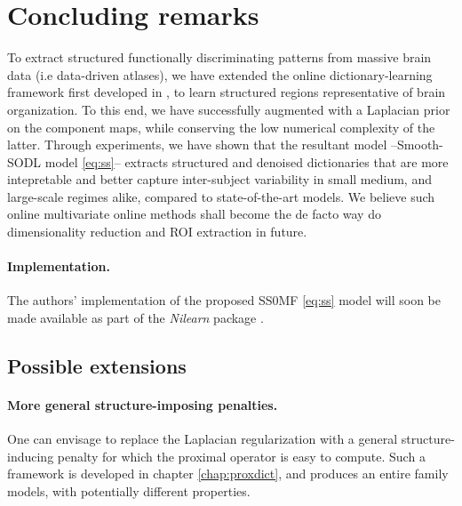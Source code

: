 \section{Concluding remarks}
To extract structured functionally discriminating patterns
from massive brain data (i.e data-driven atlases), we have extended
the online dictionary-learning framework first developed in
  \citep{mairal2010}, to learn structured regions
representative of brain organization. To this end, we have successfully augmented   \citep{mairal2010} with a Laplacian prior on the component maps,
while conserving the low numerical complexity of the latter.
Through experiments, we have shown that the resultant model --Smooth-SODL model \eqref{eq:ss}-- extracts structured and denoised dictionaries that are more intepretable and better capture inter-subject variability in small medium, and large-scale regimes alike, compared to state-of-the-art models.
We believe such online multivariate online methods shall become the de facto
way do dimensionality reduction and ROI extraction in future.

\paragraph{Implementation.} The authors' implementation of the proposed
SS0MF \eqref{eq:ss} model will soon be made available as part of the
\textit{Nilearn} package   \citep{nilearn}.

\subsection{Possible extensions}
\paragraph{More general structure-imposing penalties.}
One can envisage to replace the Laplacian regularization with a general structure-inducing penalty for which the proximal operator is easy to compute. Such a framework is developed in chapter \ref{chap:proxdict}, and produces an entire family models, with potentially different properties.

